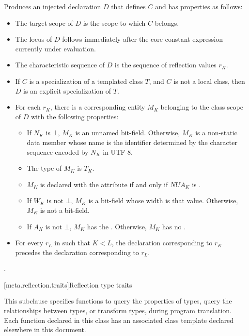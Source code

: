 \begin{itemdescr}
\pnum
\effects
Produces an injected declaration $D$
that defines $C$ and has properties as follows:
\begin{itemize}
\item
  The target scope of $D$
  is the scope to which $C$ belongs.
\item
  The locus of $D$
  follows immediately after the core constant expression
  currently under evaluation.
\item
  The characteristic sequence of $D$
  is the sequence of reflection values $r_K$.
\item
  If $C$ is a specialization of a templated class $T$,
  and $C$ is not a local class,
  then $D$ is an explicit specialization of $T$.
\item
  For each $r_K$,
  there is a corresponding entity $M_K$
  belonging to the class scope of $D$
  with the following properties:
  \begin{itemize}
  \item
    If $N_K$ is $\bot$,
    $M_K$ is an unnamed bit-field.
    Otherwise, $M_K$ is a non-static data member whose name is the identifier
    determined by the character sequence encoded by $N_K$ in UTF-8.
  \item
    The type of $M_K$ is $T_K$.
  \item
    $M_K$ is declared with the attribute 
    if and only if $\mathit{NUA}_K$ is .
  \item
    If $W_K$ is not $\bot$,
    $M_K$ is a bit-field whose width is that value.
    Otherwise, $M_K$ is not a bit-field.
  \item
    If $A_K$ is not $\bot$,
    $M_K$ has the  .
    Otherwise, $M_K$ has no .
  \end{itemize}
  \item
    For every $r_L$ in  such that $K < L$,
    the declaration corresponding to $r_K$
    precedes the declaration corresponding to $r_L$.
\end{itemize}

\pnum
\returns
{}.
\end{itemdescr}

[meta.reflection.traits]{Reflection type traits}

\pnum
This subclause specifies  functions to
query the properties of types,
query the relationships between types, or
transform types,
during program translation.
Each  function declared in this class
has an associated class template declared elsewhere in this document.

